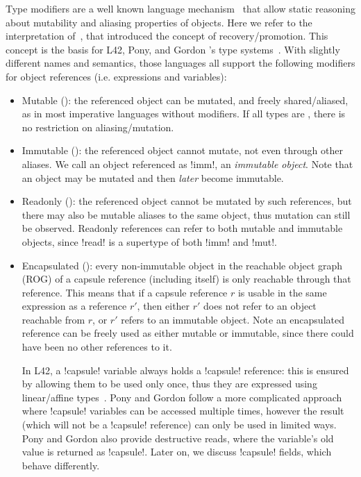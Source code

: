 Type modifiers
 are a well known language mechanism~\cite{TschantzErnst05,BirkaErnst04,OstlundEtAl08,clebsch2015deny,GianniniEtAl16,GordonEtAl12}
 that allow static reasoning about mutability and aliasing properties of objects. Here we refer to the interpretation of~\cite{GordonEtAl12}, that introduced the concept of recovery/promotion. This concept is the basis for L42, Pony, and Gordon \etal's type systems~\cite{GordonEtAl12,ServettoEtAl13a,ServettoZucca15,clebsch2015deny,clebsch2017orca}. With slightly different names and semantics, those languages all support the following modifiers for object references (i.e. expressions and variables):
\SSI\begin{itemize}
\item Mutable (\Q@mut@): the referenced object can be mutated, and freely shared/aliased, as in most imperative languages without modifiers.
If all types are \Q@mut@, there is no restriction on aliasing/mutation.
\item Immutable (\Q@imm@): the referenced object cannot mutate, not even through other aliases. We call an object referenced as \Q!imm!, an \emph{immutable object}. Note that an object may be mutated and then \emph{later} become immutable.
\item Readonly (\Q@read@): the referenced object cannot be mutated by such references, but there may also be mutable aliases to the same object, thus mutation can still be observed. Readonly references can refer to both mutable and immutable objects, since \Q!read! is a supertype of both \Q!imm! and \Q!mut!.
\item Encapsulated (\Q@capsule@):
every non-immutable object in the reachable object graph (ROG) of a capsule reference (including itself) is only reachable through that reference. This means that if a capsule reference $r$ is usable in the same expression as a reference $r'$, then either $r'$ does not refer to an object reachable from $r$, or $r'$ refers to an immutable object. Note an encapsulated reference can be freely used as either mutable or immutable, since there could have been no other references to it.

In L42, a \Q!capsule! variable always holds a \Q!capsule! reference: this is ensured by allowing them to be used only once, thus they are expressed using linear/affine types~\cite{boyland2001alias}. 
Pony and Gordon \etal follow a more complicated approach where \Q!capsule! variables can be accessed multiple times, however the result (which will not be a \Q!capsule! reference) can only be used in limited ways. Pony and Gordon also provide destructive reads, where the variable's old value is returned as \Q!capsule!.
Later on, we discuss \Q!capsule! fields, which behave differently.
\end{itemize}

